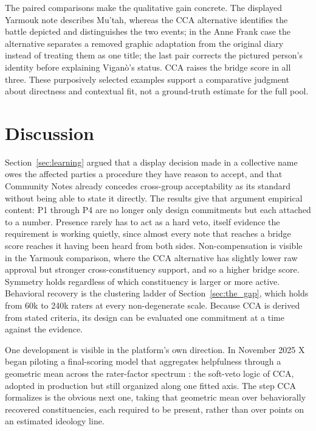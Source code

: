 \documentclass[10pt,twocolumn]{article}
\begin{document}
The paired comparisons make the qualitative gain concrete. The displayed
Yarmouk note describes Mu'tah, whereas the CCA alternative identifies the battle
depicted and distinguishes the two events; in the Anne Frank case the
alternative separates a removed graphic adaptation from the original diary
instead of treating them as one title; the last pair corrects the pictured
person's identity before explaining Vigan\`o's status. CCA raises the bridge
score in all three. These purposively selected examples support a comparative
judgment about directness and contextual fit, not a ground-truth estimate for
the full pool.

\section{Discussion}

Section~\ref{sec:learning} argued that a display decision made in a collective
name owes the affected parties a procedure they have reason to accept, and that
Community Notes already concedes cross-group acceptability as its standard
without being able to state it directly. The results give that argument
empirical content: P1 through P4 are no longer only design commitments but each
attached to a number. Presence rarely has to act as a hard veto, itself evidence
the requirement is working quietly, since almost every note that reaches a
bridge score reaches it having been heard from both sides. Non-compensation is
visible in the Yarmouk comparison, where the CCA alternative has slightly lower
raw approval but stronger cross-constituency support, and so a higher bridge
score. Symmetry holds regardless of which constituency is larger or more active.
Behavioral recovery is the clustering ladder of Section~\ref{sec:the_gap}, which
holds from 60k to 240k raters at every non-degenerate scale. Because CCA is
derived from stated criteria, its design can be evaluated one commitment at a
time against the evidence.

One development is visible in the platform's own direction. In November 2025 X
began piloting a final-scoring model that aggregates helpfulness through a
geometric mean across the rater-factor spectrum
\citep{xcommunitynotes2026ranking}: the soft-veto logic of CCA, adopted in
production but still organized along one fitted axis. The step CCA formalizes is
the obvious next one, taking that geometric mean over behaviorally recovered
constituencies, each required to be present, rather than over points on an
estimated ideology line.
\end{document}
